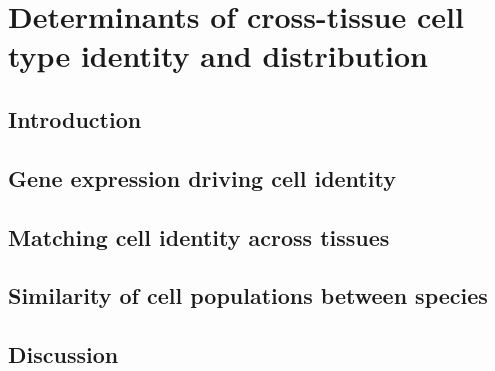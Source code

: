 \chapter{Determinants of cross-tissue cell type identity and distribution} \label{chap:CT_bio}

\ifpdf
    \graphicspath{{Chapter4/Figs/Raster/}{Chapter4/Figs/PDF/}{Chapter4/Figs/}}
\else
    \graphicspath{{Chapter4/Figs/Vector/}{Chapter4/Figs/}}
\fi



\section{Introduction}
\label{section4.1}



\section{Gene expression driving cell identity}
\label{section4.2}



\section{Matching cell identity across tissues}
\label{section4.3}



\section{Similarity of cell populations between species}
\label{section4.4}



\section{Discussion}
\label{section4.5}